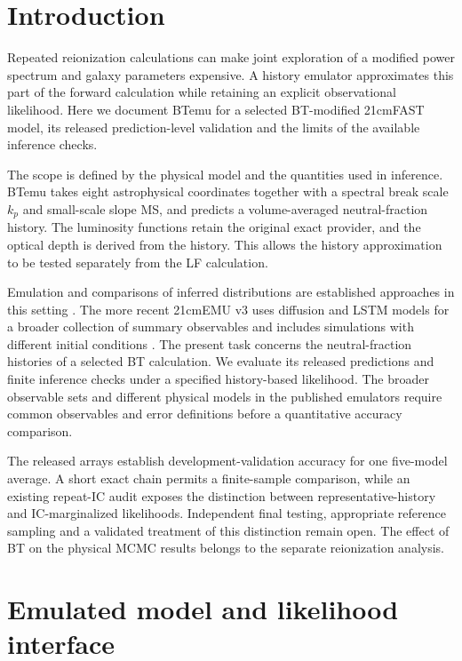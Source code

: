 \section{Introduction}\label{introduction}

Repeated reionization calculations can make joint exploration of a modified power spectrum and galaxy parameters expensive. A history emulator approximates this part of the forward calculation while retaining an explicit observational likelihood. Here we document BTemu for a selected BT-modified 21cmFAST model, its released prediction-level validation and the limits of the available inference checks.

The scope is defined by the physical model and the quantities used in inference. BTemu takes eight astrophysical coordinates together with a spectral break scale $k_p$ and small-scale slope MS, and predicts a volume-averaged neutral-fraction history. The luminosity functions retain the original exact provider, and the optical depth is derived from the history. This allows the history approximation to be tested separately from the LF calculation.

Emulation and comparisons of inferred distributions are established approaches in this setting \cite{Breitman2024}. The more recent 21cmEMU v3 uses diffusion and LSTM models for a broader collection of summary observables and includes simulations with different initial conditions \cite{Breitman2026}. The present task concerns the neutral-fraction histories of a selected BT calculation. We evaluate its released predictions and finite inference checks under a specified history-based likelihood. The broader observable sets and different physical models in the published emulators require common observables and error definitions before a quantitative accuracy comparison.

The released arrays establish development-validation accuracy for one five-model average. A short exact chain permits a finite-sample comparison, while an existing repeat-IC audit exposes the distinction between representative-history and IC-marginalized likelihoods. Independent final testing, appropriate reference sampling and a validated treatment of this distinction remain open. The effect of BT on the physical MCMC results belongs to the separate reionization analysis.


\section{Emulated model and likelihood interface}\label{physical-model-and-simulations}

